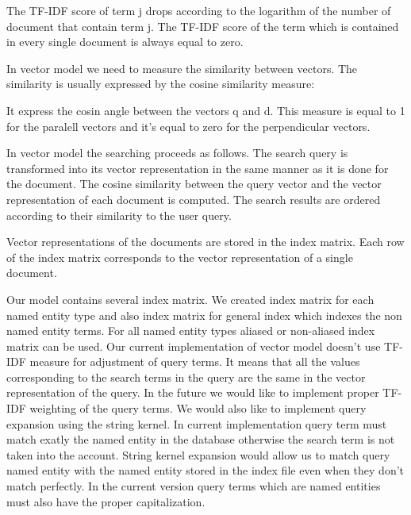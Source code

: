 
The TF-IDF score of term j drops according to the logarithm of the number of document that contain term j. The TF-IDF score of the term which is contained in every single document is always equal to zero.


In vector model we need to measure the similarity between vectors. The similarity is usually expressed by the cosine similarity measure:


It express the cosin angle between the vectors q and d. This measure is equal to 1 for the paralell vectors and it's equal to zero for the perpendicular vectors.

In vector model the searching proceeds as follows. The search query is transformed into its vector representation in the same manner as it is done for the document. The cosine similarity between the query vector and the vector representation of each document is computed. The search results are ordered according to their similarity to the user query.  

Vector representations of the documents are stored in the index matrix. Each row of the index matrix corresponds to the vector representation of a single document. 

Our model contains several index matrix. We created index matrix for each named entity type and also index matrix for general index which indexes the non named entity terms. For all named entity types aliased or non-aliased index matrix can be used. Our current implementation of vector model doesn't use TF-IDF measure for adjustment of query terms. It means that all the values corresponding to the search terms in the query are the same in the vector representation of the query. In the future we would like to implement proper TF-IDF weighting of the query terms.  We would also like to implement query expansion using the string kernel. In current implementation query term must match exatly the named entity in the database otherwise the search term is not taken into the account. String kernel expansion would allow us to match query named entity with the named entity stored in the index file even when they don't match perfectly. In the current version query terms which are named entities must also have the proper capitalization.

